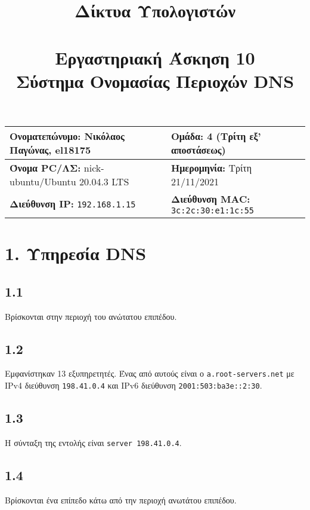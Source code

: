 

\newcommand{\imagesPath}{.}

\title{
	\textbf{Δίκτυα Υπολογιστών} \\~\\
	Εργαστηριακή Άσκηση 10 \\ 
	Σύστημα Ονομασίας Περιοχών DNS
}
\author{}
\date{}


	\maketitle
	
	\begin{tabular}{|l|l|}
		\hline
		\textbf{Ονοματεπώνυμο:} Νικόλαος Παγώνας, el18175 & \textbf{Ομάδα:} 4 (Τρίτη εξ' αποστάσεως) \\
		\hline
		\textbf{Όνομα PC/ΛΣ:} nick-ubuntu/Ubuntu 20.04.3 LTS & \textbf{Ημερομηνία:} Τρίτη 21/11/2021 \\
		\hline
		\textbf{Διεύθυνση IP:} \verb|192.168.1.15| & \textbf{Διεύθυνση MAC:} \verb|3c:2c:30:e1:1c:55| \\
		\hline
	\end{tabular}

	\section*{1. Υπηρεσία DNS}
		
		\subsection*{1.1} 
			Βρίσκονται στην περιοχή του ανώτατου επιπέδου.

		\subsection*{1.2} 
			Εμφανίστηκαν 13 εξυπηρετητές. Ένας από αυτούς είναι ο \verb|a.root-servers.net| με IPv4 διεύθυνση \verb|198.41.0.4| και IPv6 διεύθυνση \verb|2001:503:ba3e::2:30|.
			
		\subsection*{1.3} 
			Η σύνταξη της εντολής είναι \verb|server 198.41.0.4|.
		
		\subsection*{1.4} 
			Βρίσκονται ένα επίπεδο κάτω από την περιοχή ανωτάτου επιπέδου.

